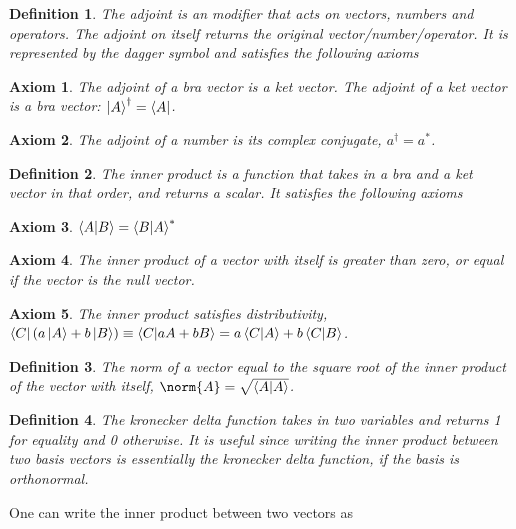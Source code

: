 \documentclass{tufte-book}
\newtheorem{axiom}{Axiom}
\newtheorem{definition}{Definition}
\begin{document}
\begin{definition}
	\label{def:2}
	The adjoint is an modifier that acts on vectors, numbers and operators. The adjoint on itself returns the original vector/number/operator. It is represented by the dagger symbol and satisfies the following axioms
\end{definition}

\begin{axiom}
	\label{ax:9}
	The adjoint of a bra vector is a ket vector. The adjoint of a ket vector is a bra vector: $\ket{A}^{\dag} = \bra{A}$.
\end{axiom}
\begin{axiom}
	\label{ax:10}
	The adjoint of a number is its complex conjugate, $a^{\dag} = a^*$.
\end{axiom}

\begin{definition}
	\label{def:3}
	The inner product is a function that takes in a bra and a ket vector in that order, and returns a scalar. It satisfies the following axioms
\end{definition}

\begin{axiom}
	\label{ax:11}
	$\braket{A|B} = \braket{B|A}^*$
\end{axiom}
\begin{axiom}
	\label{ax:12}
	The inner product of a vector with itself is greater than zero, or equal if the vector is the null vector.
\end{axiom}
\begin{axiom}
	\label{ax:13}
	The inner product satisfies distributivity, $\bra{C}(a\ket{A} + b\ket{B}) \equiv \braket{C|aA + bB} = a\braket{C|A} + b\braket{C|B}$.
\end{axiom}

\begin{definition}
	\label{def:4}
	The norm of a vector equal to the square root of the inner product of the vector with itself, $\norm{A} = \sqrt{\braket{A|A}}$.
\end{definition}

\begin{definition}
	\label{def:5}
	The kronecker delta function takes in two variables and returns 1 for equality and 0 otherwise. It is useful since writing the inner product between two basis vectors is essentially the kronecker delta function, if the basis is orthonormal.
\end{definition}

One can write the inner product between two vectors as
\end{document}
